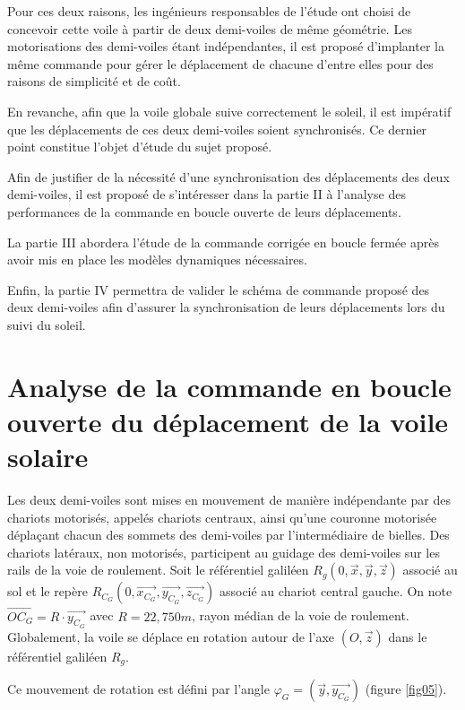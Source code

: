 Pour ces deux raisons, les ingénieurs responsables de l'étude ont choisi de concevoir cette voile à partir de deux demi-voiles de même géométrie. Les motorisations des demi-voiles étant indépendantes, il est proposé d'implanter la même commande pour gérer le déplacement de chacune d'entre elles pour des raisons de simplicité et de coût.

En revanche, afin que la voile globale suive correctement le soleil, il est impératif que les déplacements de ces deux demi-voiles soient synchronisés. Ce dernier point constitue l'objet d'étude du sujet proposé.

Afin de justifier de la nécessité d'une synchronisation des déplacements des deux demi-voiles, il est proposé de s'intéresser dans la partie II à l'analyse des performances de la commande en boucle ouverte de leurs déplacements.

La partie III abordera l'étude de la commande corrigée en boucle fermée après avoir mis en place les modèles dynamiques nécessaires.

Enfin, la partie IV permettra de valider le schéma de commande proposé des deux demi-voiles afin d'assurer la synchronisation de leurs déplacements lors du suivi du soleil.

\section{Analyse de la commande en boucle ouverte du déplacement de la voile solaire}

Les deux demi-voiles sont mises en mouvement de manière indépendante par des chariots motorisés, appelés chariots centraux, ainsi qu'une couronne motorisée déplaçant chacun des sommets des demi-voiles par l'intermédiaire de bielles. Des chariots latéraux, non motorisés, participent au guidage des demi-voiles sur les rails de la voie de roulement. Soit le référentiel galiléen $R_g(0,\overrightarrow{x},\overrightarrow{y},\overrightarrow{z})$ associé au sol et le repère $R_{C_G}(0,\overrightarrow{x_{C_G}},\overrightarrow{y_{C_G}},\overrightarrow{z_{C_G}})$ associé au chariot central gauche. On note $\overrightarrow{OC_G}=R\cdot\overrightarrow{y_{C_G}}$ avec $R=22,750m$, rayon médian de la voie de roulement. Globalement, la voile se déplace en rotation autour de l'axe $(O,\overrightarrow{z})$ dans le référentiel galiléen $R_g$.

\newpage

Ce mouvement de rotation est défini par l'angle $\varphi_G=(\overrightarrow{y},\overrightarrow{y_{C_G}})$ (figure \ref{fig05}).


